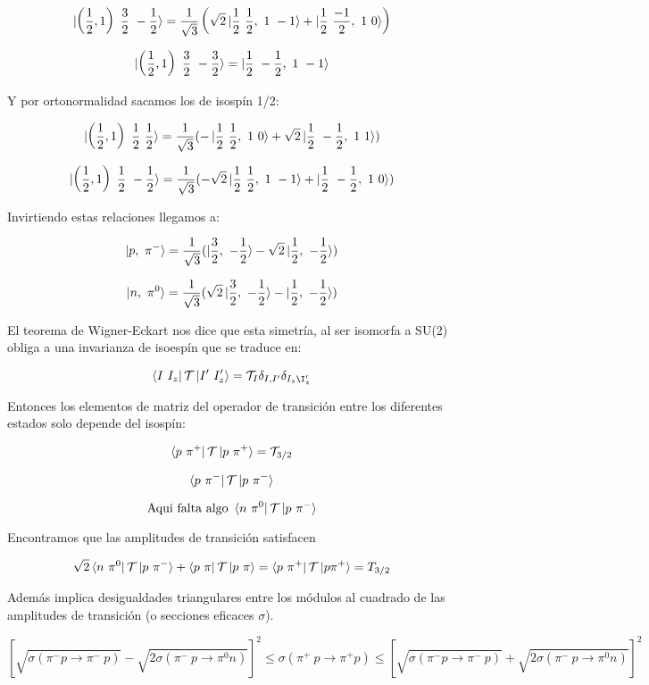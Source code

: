 $$\ket{\left ( \frac{1}{2},1\right) \ \frac{3}{2} \ -\frac{1}{2}}= \frac{1}{\sqrt{3}}\left ( \sqrt{2} \ket{\frac{1}{2} \ \frac{1}{2}, \ 1 \ -1} + \ket{\frac{1}{2} \ \frac{-1}{2} , \ 1 \ 0}\right)$$

$$\ket{\left ( \frac{1}{2},1\right) \ \frac{3}{2} \ -\frac{3}{2}}=\ket{\frac{1}{2} \ -\frac{1}{2} , \ 1 \ -1}$$

Y por ortonormalidad sacamos los de isospín 1/2:

$$\ket{\left ( \frac{1}{2},1\right) \ \frac{1}{2} \ \frac{1}{2}}= \frac{1}{\sqrt{3}}(-\ket{\frac{1}{2} \ \frac{1}{2} ,\ 1 \ 0} + \sqrt{2} \ket{\frac{1}{2} \ -\frac{1}{2} ,\ 1 \ 1})$$

$$\ket{\left ( \frac{1}{2},1\right) \ \frac{1}{2} \ -\frac{1}{2}}= \frac{1}{\sqrt{3}}(-\sqrt{2}\ket{\frac{1}{2} \ \frac{1}{2} ,\ 1 \ -1} + \ket{\frac{1}{2} \ -\frac{1}{2} ,\ 1 \ 0})$$

Invirtiendo estas relaciones llegamos a:

$$\ket{p, \ \pi ^-}=\frac{1}{\sqrt{3}}(\ket{\frac{3}{2},\ -\frac{1}{2}} - \sqrt{2} \ket{\frac{1}{2}, \ -\frac{1}{2}})$$

$$\ket{n, \ \pi ^0}=\frac{1}{\sqrt{3}}(\sqrt{2}\ket{\frac{3}{2},\ -\frac{1}{2}} -\ket{\frac{1}{2}, \ -\frac{1}{2}})$$

El teorema de Wigner-Eckart nos dice que esta simetría, al ser isomorfa a SU(2) obliga a una invarianza de isoespín que se traduce en:

$$\bra{I \ I_z}\mathcal{T}\ket{I' \ I'_z}=\mathcal{T}_I \delta _{I, I'}\delta _{I_z \I_z'}$$

Entonces los elementos de matriz del operador de transición entre los diferentes estados solo depende del isospín:

$$\bra{p \ \pi ^+}\mathcal{T}\ket{p \ \pi ^+}=\mathcal{T}_{3/2}$$

$$\bra{p \ \pi ^-}\mathcal{T}\ket{p \ \pi ^-}$$


$$\text{Aqui falta algo }\bra{n \ \pi ^0}\mathcal{T}\ket{p \ \pi ^-}$$

Encontramos que las amplitudes de transición satisfacen

$$\sqrt{2} \bra{n \ \pi ^0}\mathcal{T}\ket{p \ \pi ^-} + \bra{p \ \pi}\mathcal{T}\ket{p \ \pi}=\bra{p \ \pi ^+} \mathcal{T} \ket{p \pi ^+} = T_{3/2}$$

Además implica desigualdades triangulares entre los módulos al cuadrado de las amplitudes de transición (o secciones eficaces $\sigma$).

$$[\sqrt{\sigma (\pi ^-p \to \pi ^- \ p)} - \sqrt{2\sigma (\pi ^- \ p \to \pi ^0 n)}]^2\leq \sigma (\pi ^+ \ p \to \pi ^+ p) \leq [\sqrt{\sigma (\pi ^- p \to \pi ^- \ p)} + \sqrt{2\sigma (\pi ^- \ p \to \pi ^0 n)}]^2$$

